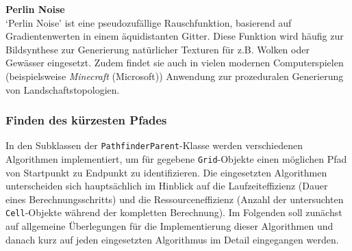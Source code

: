 \textbf{Perlin Noise}\\
`Perlin Noise' ist eine pseudozufällige Rauschfunktion, basierend auf Gradientenwerten in einem äquidistanten Gitter.
Diese Funktion wird häufig zur Bildsynthese zur Generierung natürlicher Texturen für z.B. Wolken oder Gewässer eingesetzt.
Zudem findet sie auch in vielen modernen Computerspielen (beispielsweise \textit{Minecraft} (Microsoft)) Anwendung zur
prozeduralen Generierung von Landschaftstopologien.

\subsubsection{Finden des kürzesten Pfades}
In den Subklassen der \texttt{PathfinderParent}-Klasse werden verschiedenen Algorithmen implementiert, um für gegebene
\texttt{Grid}-Objekte einen möglichen Pfad von Startpunkt zu Endpunkt zu identifizieren.
Die eingesetzten Algorithmen unterscheiden sich hauptsächlich im Hinblick auf die Laufzeiteffizienz (Dauer eines Berechnungsschritts)
und die Ressourceneffizienz (Anzahl der untersuchten \texttt{Cell}-Objekte während der kompletten Berechnung).
Im Folgenden soll zunächst auf allgemeine Überlegungen für die Implementierung dieser Algorithmen und danach kurz auf
jeden eingesetzten Algorithmus im Detail eingegangen werden.\\\\

